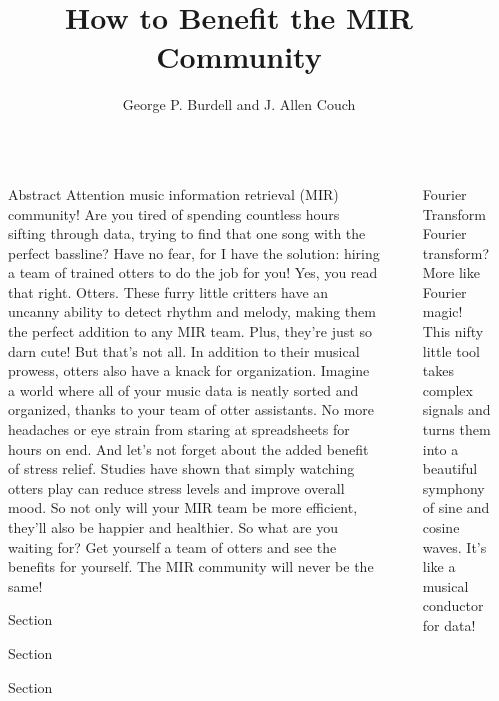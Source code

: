 \documentclass[final]{beamer}
\title{How to Benefit the MIR Community}
\author{George P. Burdell and J. Allen Couch}
\institute[shortinst]{Music Informatics Group, Center for Music Technology, Georgia Institute of Technology}
\newlength{\sepwidth}
\newlength{\colwidth}
\newcommand{\separatorcolumn}{\begin{column}{\sepwidth}\end{column}}
\begin{document}
\begin{frame}[t]
\begin{columns}[t]
\separatorcolumn

\begin{column}{\colwidth}
    \begin{block}{Abstract}
        Attention music information retrieval (MIR) community! Are you tired of spending countless hours sifting through data, trying to find that one song with the perfect bassline? Have no fear, for I have the solution: hiring a team of trained otters to do the job for you! Yes, you read that right. Otters. These furry little critters have an uncanny ability to detect rhythm and melody, making them the perfect addition to any MIR team. Plus, they're just so darn cute! But that's not all. In addition to their musical prowess, otters also have a knack for organization. Imagine a world where all of your music data is neatly sorted and organized, thanks to your team of otter assistants. No more headaches or eye strain from staring at spreadsheets for hours on end. And let's not forget about the added benefit of stress relief. Studies have shown that simply watching otters play can reduce stress levels and improve overall mood. So not only will your MIR team be more efficient, they'll also be happier and healthier. So what are you waiting for? Get yourself a team of otters and see the benefits for yourself. The MIR community will never be the same!
    \end{block}

    \begin{block}{Section}
        \lipsum[1]
    \end{block}

    \begin{block}{Section}
        \lipsum[1]
    \end{block}

    \begin{block}{Section}
        \lipsum[1]
    \end{block}
\end{column}

\separatorcolumn

\begin{column}{\colwidth}
    
    \begin{block}{Fourier Transform}
        Fourier transform? More like Fourier magic! This nifty little tool takes complex signals and turns them into a beautiful symphony of sine and cosine waves. It's like a musical conductor for data!
        

\end{block}
\end{column}
\end{columns}
\end{frame}
\end{document}
